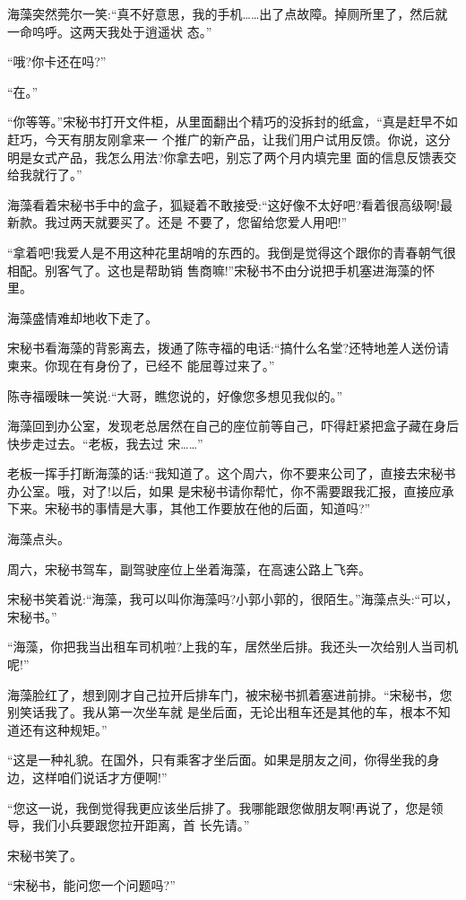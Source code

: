 \documentclass[11pt,a4paper,onecolumn]{article}
\begin{document}
海藻突然莞尔一笑:``真不好意思，我的手机……出了点故障。掉厕所里了，然后就一命呜呼。这两天我处于逍遥状
态。''

``哦?你卡还在吗?''

``在。''

``你等等。''宋秘书打开文件柜，从里面翻出个精巧的没拆封的纸盒，``真是赶早不如赶巧，今天有朋友刚拿来一
个推广的新产品，让我们用户试用反馈。你说，这分明是女式产品，我怎么用法?你拿去吧，别忘了两个月内填完里
面的信息反馈表交给我就行了。''

海藻看着宋秘书手中的盒子，狐疑着不敢接受:``这好像不太好吧?看着很高级啊!最新款。我过两天就要买了。还是
不要了，您留给您爱人用吧!''

``拿着吧!我爱人是不用这种花里胡哨的东西的。我倒是觉得这个跟你的青春朝气很相配。别客气了。这也是帮助销
售商嘛!''宋秘书不由分说把手机塞进海藻的怀里。

海藻盛情难却地收下走了。

宋秘书看海藻的背影离去，拨通了陈寺福的电话:``搞什么名堂?还特地差人送份请柬来。你现在有身份了，已经不
能屈尊过来了。''

陈寺福暧昧一笑说:``大哥，瞧您说的，好像您多想见我似的。''

海藻回到办公室，发现老总居然在自己的座位前等自己，吓得赶紧把盒子藏在身后快步走过去。``老板，我去过
宋……''

老板一挥手打断海藻的话:``我知道了。这个周六，你不要来公司了，直接去宋秘书办公室。哦，对了!以后，如果
是宋秘书请你帮忙，你不需要跟我汇报，直接应承下来。宋秘书的事情是大事，其他工作要放在他的后面，知道吗?''

海藻点头。

周六，宋秘书驾车，副驾驶座位上坐着海藻，在高速公路上飞奔。

宋秘书笑着说:``海藻，我可以叫你海藻吗?小郭小郭的，很陌生。''海藻点头:``可以，宋秘书。''

``海藻，你把我当出租车司机啦?上我的车，居然坐后排。我还头一次给别人当司机呢!''

海藻脸红了，想到刚才自己拉开后排车门，被宋秘书抓着塞进前排。``宋秘书，您别笑话我了。我从第一次坐车就
是坐后面，无论出租车还是其他的车，根本不知道还有这种规矩。''

``这是一种礼貌。在国外，只有乘客才坐后面。如果是朋友之间，你得坐我的身边，这样咱们说话才方便啊!''

``您这一说，我倒觉得我更应该坐后排了。我哪能跟您做朋友啊!再说了，您是领导，我们小兵要跟您拉开距离，首
长先请。''

宋秘书笑了。

``宋秘书，能问您一个问题吗?''
\end{document}
